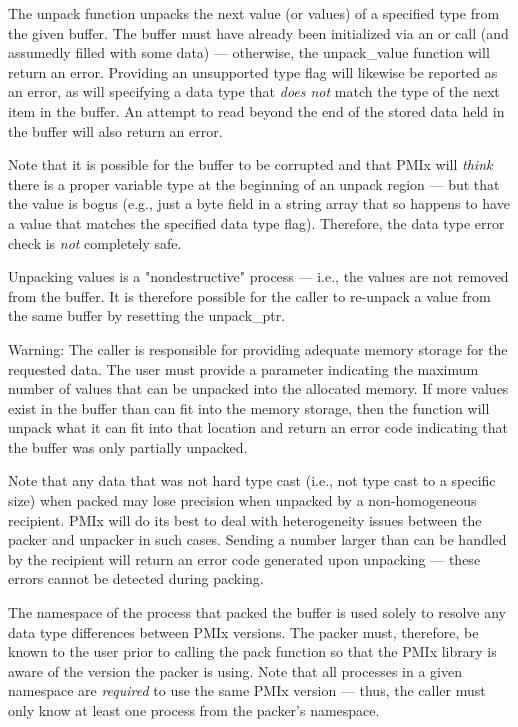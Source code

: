 The unpack function unpacks the next value (or values) of a specified type from the given buffer. The buffer must have already been initialized via an  or  call (and assumedly filled with some data) --- otherwise, the unpack_value function will return an error. Providing an unsupported type flag will likewise be reported as an error, as will specifying a data type that \textit{does not} match the type of the next item in the buffer. An attempt to read beyond the end of the stored data held in the buffer will also return an error.

Note that it is possible for the buffer to be corrupted and that \ac{PMIx} will \textit{think} there is a proper variable type at the beginning of an unpack region --- but that the value is bogus (e.g., just a byte field in a string array that so happens to have a value that matches the specified data type flag). Therefore, the data type error check is \textit{not} completely safe.

Unpacking values is a "nondestructive" process --- i.e., the values are not removed from the buffer. It is therefore possible for the caller to re-unpack a value from the same buffer by resetting the unpack_ptr.

Warning: The caller is responsible for providing adequate memory storage for the requested data. The user must provide a parameter indicating the maximum number of values that can be unpacked into the allocated memory. If more values exist in the buffer than can fit into the memory storage, then the function will unpack what it can fit into that location and return an error code indicating that the buffer was only partially unpacked.

Note that any data that was not hard type cast (i.e., not type cast to a specific size) when packed may lose precision when unpacked by a non-homogeneous recipient. \ac{PMIx} will do its best to deal with heterogeneity issues between the packer and unpacker in such cases. Sending a number larger than can be handled by the recipient will return an error code generated upon unpacking --- these errors cannot be detected during packing.

The namespace of the process that packed the buffer is used solely to resolve any data type
differences between \ac{PMIx} versions. The packer must, therefore, be
known to the user prior to calling the pack function so that the
\ac{PMIx} library is aware of the version the packer is using. Note that
all processes in a given namespace are \textit{required} to use the same \ac{PMIx}
version --- thus, the caller must only know at least one process from the
packer's namespace.


